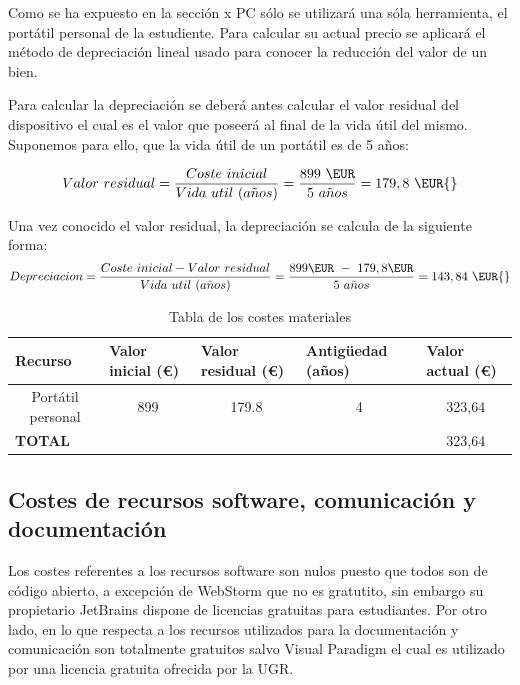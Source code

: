 Como se ha expuesto en la sección x PC sólo se utilizará una sóla herramienta, el portátil personal de la estudiente. Para calcular su actual precio se aplicará el método de depreciación lineal usado para conocer la reducción del valor de un bien. 

Para calcular la depreciación se deberá antes calcular el valor residual del dispositivo el cual es el valor que poseerá al final de la vida útil del mismo. Suponemos para ello, que la vida útil de un portátil es de 5 años: 

\begin{equation}
    Valor\ residual = \frac{Coste\ inicial}{Vida\ util\ (a\tilde{n}os)} = \frac{899 \ \EUR}{5 \ a\tilde{n}os} = 179,8\ \EUR{}
\end{equation}

 Una vez conocido el valor residual, la depreciación se calcula de la siguiente forma:
\begin{equation}
    Depreciacion = \frac{Coste \ inicial - Valor\ residual}{Vida\ util\ ( a\tilde{n}os)} = \frac{899\EUR \ - \ 179,8\EUR }{5 \ a\tilde{n}os} = 143,84\ \EUR{}
\end{equation}

\begin{table}[H]
\begin{tabular}{|l|l|l|l|c|}
\hline
\textbf{Recurso}                        & \textbf{Valor inicial (€)} & \textbf{Valor residual (€)} & \textbf{Antigüedad (años)} & \multicolumn{1}{l|}{\textbf{Valor actual (€)}} \\ \hline
\multicolumn{1}{|c|}{Portátil personal} & \multicolumn{1}{c|}{899}   & \multicolumn{1}{c|}{179.8}  & \multicolumn{1}{c|}{4}     & 323,64                                         \\ \hline
\textbf{TOTAL}                          &                            &                             &                            & 323,64                                         \\ \hline
\end{tabular}
\caption{Tabla de los costes materiales}
\end{table}

\subsection{Costes de recursos software, comunicación y documentación}
Los costes referentes a los recursos software son nulos puesto que todos son de código abierto, a excepción de WebStorm que no es gratutito, sin embargo su propietario JetBrains dispone de licencias gratuitas para estudiantes. Por otro lado, en lo que respecta a los recursos utilizados para la documentación y comunicación son totalmente gratuitos salvo Visual Paradigm el cual es utilizado por una licencia gratuita ofrecida por la UGR.


